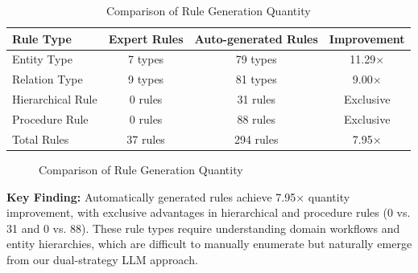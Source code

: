 \documentclass[runningheads]{llncs}
\begin{document}
\begin{table}[H]
    \centering
    \caption{Comparison of Rule Generation Quantity}
    \label{tab:rule_quantity}
    \begin{tabular}{l c c c}
    \toprule
    Rule Type & Expert Rules & Auto-generated Rules & Improvement \\
    \midrule
    Entity Type & 7 types & 79 types & 11.29× \\
    Relation Type & 9 types & 81 types & 9.00× \\
    Hierarchical Rule & 0 rules & 31 rules & Exclusive \\
    Procedure Rule & 0 rules & 88 rules & Exclusive \\
    Total Rules & 37 rules & 294 rules & 7.95× \\
    \bottomrule
    \end{tabular}
\end{table}

\begin{figure}[H]
    \centering
    \caption{Comparison of Rule Generation Quantity}
    \label{fig:rule_quantity}
\end{figure}

\textbf{Key Finding:} Automatically generated rules achieve 7.95× quantity improvement, with exclusive advantages in hierarchical and procedure rules (0 vs. 31 and 0 vs. 88). These rule types require understanding domain workflows and entity hierarchies, which are difficult to manually enumerate but naturally emerge from our dual-strategy LLM approach.
\end{document}
